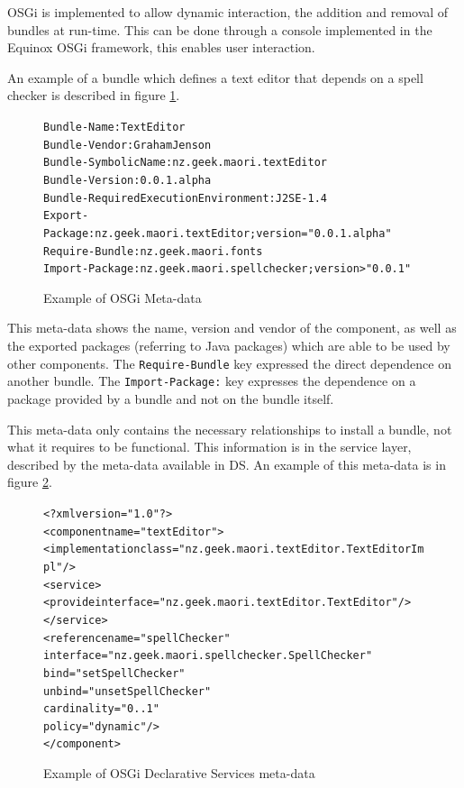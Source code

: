 OSGi is implemented to allow dynamic interaction, the addition and removal of bundles at run-time.
This can be done through a console implemented in the Equinox OSGi framework, this enables user interaction.

An example of a bundle which defines a text editor that depends on a spell checker is described in figure \ref{osgibundle}.

\begin{figure}[htp]
\begin{center}
\begin{alltt}
Bundle-Name: TextEditor
Bundle-Vendor: Graham Jenson
Bundle-SymbolicName: nz.geek.maori.textEditor
Bundle-Version: 0.0.1.alpha
Bundle-RequiredExecutionEnvironment: J2SE-1.4
Export-Package: nz.geek.maori.textEditor;version="0.0.1.alpha"
Require-Bundle: nz.geek.maori.fonts
Import-Package: nz.geek.maori.spellchecker;version>"0.0.1"
\end{alltt}
  \caption[OSGi Meta-data]{Example of OSGi Meta-data}
  \label{osgibundle}
\end{center}
\end{figure}

This meta-data shows the name, version and vendor of the component, as well as the exported packages (referring to Java packages) which are able to be used by other components.
The \verb+Require-Bundle+ key expressed the direct dependence on another bundle.
The \verb+Import-Package:+ key expresses the dependence on a package provided by a bundle and not on the bundle itself.

This meta-data only contains the necessary relationships to install a bundle, not what it requires to be functional.
This information is in the service layer, described by the meta-data available in DS.
An example of this meta-data is in figure \ref{dsmetadata}.

\begin{figure}[htp]
\begin{center}
\begin{alltt}
<?xml version="1.0"?>
<component name="textEditor">
    <implementation class="nz.geek.maori.textEditor.TextEditorImpl"/>
    <service>
        <provide interface="nz.geek.maori.textEditor.TextEditor"/>
    </service>
    <reference name="spellChecker"
        interface="nz.geek.maori.spellchecker.SpellChecker"
        bind="setSpellChecker"
        unbind="unsetSpellChecker"
        cardinality="0..1"
        policy="dynamic"/>
</component>
\end{alltt}
  \caption[OSGi Declarative Services]{Example of OSGi Declarative Services meta-data}
  \label{dsmetadata}
\end{center}
\end{figure}

